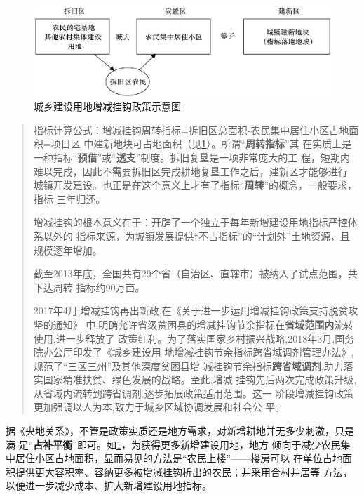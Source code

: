 \begin{figure}[htbp!]
  \centering
  \includegraphics[width=0.9\linewidth]{figures/zengjianguagou.jpg}
  \caption{\label{fig:zengjianguagou}城乡建设用地增减挂钩政策示意图}
\end{figure}

\begin{quotation}
  指标计算公式：增减挂钩周转指标=拆旧区总面积-农民集中居住小区占地面积=项目区
  中建新地块可占地面积（见\cref{fig:zengjianguagou}）。所谓“\textbf{周转指标}”其
  在实质上是一种指标“\textbf{预借}”或“\textbf{透支}”制度。拆旧复垦是一项非常庞大的工
  程，短期内难以完成，因此不需要拆旧区完成耕地复垦工作之后，建新区才能够进行
  城镇开发建设。也正是在这个意义上才有了指标“\textbf{周转}”的概念，一般要求，指标
  三年归还。

  增减挂钩的根本意义在于：开辟了一个独立于每年新增建设用地指标严控体系以外的
  指标来源，为城镇发展提供“不占指标”的“计划外”土地资源，且规模逐年增加。\cite{yangdi}


  截至2013年底，全国共有29个省（自治区、直辖市）被纳入了试点范围，共下达周转
  指标约90万亩。

  2017年4月,增减挂钩再出新政,在《关于进一步运用增减挂钩政策支持脱贫攻坚的通知》
  中,明确允许省级贫困县的增减挂钩节余指标在\textbf{省域范围内}流转使用,进一步释放了
  政策红利。为了落实国家乡村振兴战略,2018年3月,国务院办公厅印发了《城乡建设用
  地增减挂钩节余指标跨省域调剂管理办法》,规范了“三区三州”及其他深度贫困县增
  减挂钩节余指标\textbf{跨省域调剂},助力落实国家精准扶贫、绿色发展的战略。至此,增减
  挂钩先后两次完成政策升级,从省域内流转到跨省调剂,逐步拓展政策适用范围。这一
  阶段增减挂钩政策更加强调以人为本,致力于城乡区域协调发展和社会公
  平。\cite{zengjianzongshu}
\end{quotation}

据《央地关系》，不管是政策实质还是地方需求，对新增耕地并无多少刺激，只是满
足“\textbf{占补平衡}”即可。如\cref{fig:zengjianguagou}，为获得更多新增建设用地，地方
倾向于减少农民集中居住小区占地面积，显而易见的方法是“农民上楼”——楼房可以
在单位占地面积提供更大容积率、容纳更多被增减挂钩析出的农民；并采用合村并居等
方法，以便进一步减少成本、扩大新增建设用地指标。

